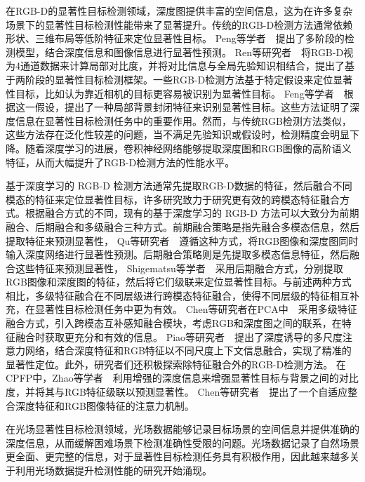 在RGB-D的显著性目标检测领域，深度图提供丰富的空间信息，这为在许多复杂场景下的显著性目标检测性能带来了显著提升。传统的RGB-D检测方法通常依赖形状、三维布局等低阶特征来定位显著性目标。
Peng等学者~\cite{peng2014rgbd}~提出了多阶段的检测模型，结合深度信息和图像信息进行显著性预测。
Ren等研究者~\cite{ren2015exploiting}~将RGB-D视为4通道数据来计算局部对比度，并将对比信息与全局先验知识相结合，提出了基于两阶段的显著性目标检测框架。一些RGB-D检测方法基于特定假设来定位显著性目标，比如认为靠近相机的目标更容易被识别为显著性目标。
Feng等学者~\cite{shigematsu2017learning}~根据这一假设，提出了一种局部背景封闭特征来识别显著性目标。这些方法证明了深度信息在显著性目标检测任务中的重要作用。然而，与传统RGB检测方法类似，这些方法存在泛化性较差的问题，当不满足先验知识或假设时，检测精度会明显下降。随着深度学习的进展，卷积神经网络能够提取深度图和RGB图像的高阶语义特征，从而大幅提升了RGB-D检测方法的性能水平。


基于深度学习的 RGB-D 检测方法通常先提取RGB-D数据的特征，然后融合不同模态的特征来定位显著性目标，许多研究致力于研究更有效的跨模态特征融合方式。根据融合方式的不同，现有的基于深度学习的 RGB-D 方法可以大致分为前期融合、后期融合和多级融合三种方式。前期融合策略是指先融合多模态信息，然后提取特征来预测显著性，
Qu等研究者~\cite{qu2017rgbd}~遵循这种方式，将RGB图像和深度图同时输入深度网络进行显著性预测。后期融合策略则是先提取多模态信息特征，然后融合这些特征来预测显著性，
Shigematsu等学者~\cite{shigematsu2017learning}~采用后期融合方式，分别提取RGB图像和深度图的特征，然后将它们级联来定位显著性目标。与前述两种方式相比，多级特征融合在不同层级进行跨模态特征融合，使得不同层级的特征相互补充，在显著性目标检测任务中更为有效。
Chen等研究者在PCA中~\cite{chen2018progressively}~采用多级特征融合方式，引入跨模态互补感知融合模块，考虑RGB和深度图之间的联系，在特征融合时获取更充分和有效的信息。
Piao等研究者~\cite{piao2019depth}~提出了深度诱导的多尺度注意力网络，结合深度特征和RGB特征以不同尺度上下文信息融合，实现了精准的显著性定位。此外，研究者们还积极探索除特征融合外的RGB-D检测方法。
在CPFP中，Zhao等学者~\cite{zhao2019contrast}~利用增强的深度信息来增强显著性目标与背景之间的对比度，并将其与RGB特征级联以预测显著性。
Chen等研究者~\cite{chen2019three}~提出了一个自适应整合深度特征和RGB图像特征的注意力机制。








在光场显著性目标检测领域，光场数据能够记录目标场景的空间信息并提供准确的深度信息，从而缓解困难场景下检测准确性受限的问题。光场数据记录了自然场景更全面、更完整的信息，对于显著性目标检测任务具有积极作用，因此越来越多关于利用光场数据提升检测性能的研究开始涌现。



